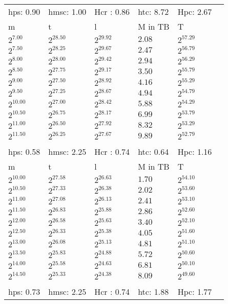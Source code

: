 \begin{tabular}{llllll}
hps: 0.90 & hmsc: 1.00 & Hcr : 0.86 & htc: 8.72 & Hpc: 2.67 &  \\
m & t & l & M in TB & T \\
$2^{7.00}$ & $2^{28.50}$ & $2^{29.92}$ & $2.08$ & $2^{57.29}$ \\
$2^{7.50}$ & $2^{28.25}$ & $2^{29.67}$ & $2.47$ & $2^{56.79}$ \\
$2^{8.00}$ & $2^{28.00}$ & $2^{29.42}$ & $2.94$ & $2^{56.29}$ \\
$2^{8.50}$ & $2^{27.75}$ & $2^{29.17}$ & $3.50$ & $2^{55.79}$ \\
$2^{9.00}$ & $2^{27.50}$ & $2^{28.92}$ & $4.16$ & $2^{55.29}$ \\
$2^{9.50}$ & $2^{27.25}$ & $2^{28.67}$ & $4.94$ & $2^{54.79}$ \\
$2^{10.00}$ & $2^{27.00}$ & $2^{28.42}$ & $5.88$ & $2^{54.29}$ \\
$2^{10.50}$ & $2^{26.75}$ & $2^{28.17}$ & $6.99$ & $2^{53.79}$ \\
$2^{11.00}$ & $2^{26.50}$ & $2^{27.92}$ & $8.32$ & $2^{53.29}$ \\
$2^{11.50}$ & $2^{26.25}$ & $2^{27.67}$ & $9.89$ & $2^{52.79}$ \\
 &  &  &  &  &  \\
hps: 0.58 & hmsc: 2.25 & Hcr : 0.74 & htc: 0.64 & Hpc: 1.16 &  \\
m & t & l & M in TB & T \\
$2^{10.00}$ & $2^{27.58}$ & $2^{26.63}$ & $1.70$ & $2^{54.10}$ \\
$2^{10.50}$ & $2^{27.33}$ & $2^{26.38}$ & $2.02$ & $2^{53.60}$ \\
$2^{11.00}$ & $2^{27.08}$ & $2^{26.13}$ & $2.41$ & $2^{53.10}$ \\
$2^{11.50}$ & $2^{26.83}$ & $2^{25.88}$ & $2.86$ & $2^{52.60}$ \\
$2^{12.00}$ & $2^{26.58}$ & $2^{25.63}$ & $3.40$ & $2^{52.10}$ \\
$2^{12.50}$ & $2^{26.33}$ & $2^{25.38}$ & $4.05$ & $2^{51.60}$ \\
$2^{13.00}$ & $2^{26.08}$ & $2^{25.13}$ & $4.81$ & $2^{51.10}$ \\
$2^{13.50}$ & $2^{25.83}$ & $2^{24.88}$ & $5.72$ & $2^{50.60}$ \\
$2^{14.00}$ & $2^{25.58}$ & $2^{24.63}$ & $6.81$ & $2^{50.10}$ \\
$2^{14.50}$ & $2^{25.33}$ & $2^{24.38}$ & $8.09$ & $2^{49.60}$ \\
 &  &  &  &  &  \\
hps: 0.73 & hmsc: 2.25 & Hcr : 0.74 & htc: 1.88 & Hpc: 1.77 &  \\

\end{tabular}
